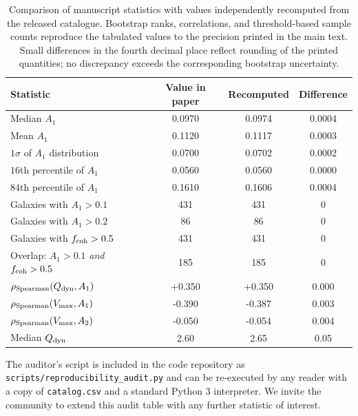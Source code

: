 \documentclass[fleqn,usenatbib]{mnras}
\newcommand{\Am}[1]{A_{#1}}
\newcommand{\Amone}{\ensuremath{\Am{1}}}
\newcommand{\Amtwo}{\ensuremath{\Am{2}}}
\begin{document}
\begin{table}
  \centering
  \caption{Comparison of manuscript statistics with values
    independently recomputed from the released catalogue.
    Bootstrap ranks, correlations, and threshold-based sample counts
    reproduce the tabulated values to the precision printed in the
    main text.  Small differences in the fourth decimal place
    reflect rounding of the printed quantities; no discrepancy
    exceeds the corresponding bootstrap uncertainty.}
  \label{tab:reproducibility_audit}
  \begin{tabular}{lccc}
    \toprule
    Statistic & Value in paper & Recomputed & Difference \\
    \midrule
    Median $\Amone$                                      &     0.0970 &     0.0974 &     0.0004 \\
    Mean $\Amone$                                        &     0.1120 &     0.1117 &     0.0003 \\
    $1\sigma$ of $\Amone$ distribution                   &     0.0700 &     0.0702 &     0.0002 \\
    $16$th percentile of $\Amone$                        &     0.0560 &     0.0560 &     0.0000 \\
    $84$th percentile of $\Amone$                        &     0.1610 &     0.1606 &     0.0004 \\
    \midrule
    Galaxies with $\Amone > 0.1$                         &        431 &        431 &          0 \\
    Galaxies with $\Amone > 0.2$                         &         86 &         86 &          0 \\
    Galaxies with $f_{\rm coh} > 0.5$                    &        431 &        431 &          0 \\
    Overlap: $\Amone > 0.1$ \emph{and} $f_{\rm coh} > 0.5$ &        185 &        185 &          0 \\
    \midrule
    $\rho_{\rm Spearman}(Q_{\rm dyn}, \Amone)$           &     +0.350 &     +0.350 &      0.000 \\
    $\rho_{\rm Spearman}(V_{\rm max}, \Amone)$           &     -0.390 &     -0.387 &      0.003 \\
    $\rho_{\rm Spearman}(V_{\rm max}, \Amtwo)$           &     -0.050 &     -0.054 &      0.004 \\
    Median $Q_{\rm dyn}$                                 &       2.60 &       2.65 &       0.05 \\
    \bottomrule
  \end{tabular}
\end{table}

The auditor's script is included in the code repository as
\texttt{scripts/reproducibility\_audit.py} and can be re-executed
by any reader with a copy of \texttt{catalog.csv} and a standard
Python 3 interpreter.  We invite the community to extend this
audit table with any further statistic of interest.

\bsp
\label{lastpage}
\end{document}
